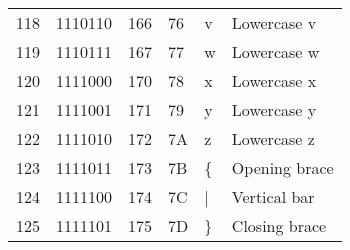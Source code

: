 \begin{center}
\begin{longtable}{llllll}
\rowcolor[HTML]{F3F6F6} 
{\color[HTML]{404040} 118}              & {\color[HTML]{404040} 1110110}         & {\color[HTML]{404040} 166}            & {\color[HTML]{404040} 76}                   & {\color[HTML]{404040} v}                  & {\color[HTML]{404040} Lowercase v}                           \\
\rowcolor[HTML]{FCFCFC} 
{\color[HTML]{404040} 119}              & {\color[HTML]{404040} 1110111}         & {\color[HTML]{404040} 167}            & {\color[HTML]{404040} 77}                   & {\color[HTML]{404040} w}                  & {\color[HTML]{404040} Lowercase w}                           \\
\rowcolor[HTML]{F3F6F6} 
{\color[HTML]{404040} 120}              & {\color[HTML]{404040} 1111000}         & {\color[HTML]{404040} 170}            & {\color[HTML]{404040} 78}                   & {\color[HTML]{404040} x}                  & {\color[HTML]{404040} Lowercase x}                           \\
\rowcolor[HTML]{FCFCFC} 
{\color[HTML]{404040} 121}              & {\color[HTML]{404040} 1111001}         & {\color[HTML]{404040} 171}            & {\color[HTML]{404040} 79}                   & {\color[HTML]{404040} y}                  & {\color[HTML]{404040} Lowercase y}                           \\
\rowcolor[HTML]{F3F6F6} 
{\color[HTML]{404040} 122}              & {\color[HTML]{404040} 1111010}         & {\color[HTML]{404040} 172}            & {\color[HTML]{404040} 7A}                   & {\color[HTML]{404040} z}                  & {\color[HTML]{404040} Lowercase z}                           \\
\rowcolor[HTML]{FCFCFC} 
{\color[HTML]{404040} 123}              & {\color[HTML]{404040} 1111011}         & {\color[HTML]{404040} 173}            & {\color[HTML]{404040} 7B}                   & {\color[HTML]{404040} \{}                 & {\color[HTML]{404040} Opening brace}                         \\
\rowcolor[HTML]{F3F6F6} 
{\color[HTML]{404040} 124}              & {\color[HTML]{404040} 1111100}         & {\color[HTML]{404040} 174}            & {\color[HTML]{404040} 7C}                   & {\color[HTML]{404040} |}                  & {\color[HTML]{404040} Vertical bar}                          \\
\rowcolor[HTML]{FCFCFC} 
{\color[HTML]{404040} 125}              & {\color[HTML]{404040} 1111101}         & {\color[HTML]{404040} 175}            & {\color[HTML]{404040} 7D}                   & {\color[HTML]{404040} \}}                 & {\color[HTML]{404040} Closing brace}                         \\

\end{longtable}
\end{center}
